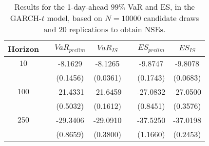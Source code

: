 \begin{table}[h] 
\centering 
\caption{Results for the 1-day-ahead $99\%$ VaR and ES, in the GARCH-$t$ model, based on $N=10000$ candidate draws and $20$ replications to obtain NSEs.} 
\label{tab:res_t_garch} 
\begin{tabular}{ccccccc}  
 Horizon & & $VaR_{prelim}$ & $VaR_{IS}$ & & $ES_{prelim}$ & $ES_{IS}$ \\ \hline 
$10$ & & -8.1629 & -8.1265 & & -9.8747 & -9.8078  \\ 
 & & (0.1456) & (0.0361) & & (0.1743) & (0.0683)   \\ [1ex] 
$100$ & & -21.4331 & -21.6459 & & -27.0832 & -27.0500  \\ 
 & & (0.5032) & (0.1612) & & (0.8451) & (0.3576)   \\ [1ex] 
$250$ & & -29.3406 & -29.0910 & & -37.5250 & -37.0198  \\ 
 & & (0.8659) & (0.3800) & & (1.1660) & (0.2453)   \\ [1ex] 
\hline 
\end{tabular} 
\end{table} 
